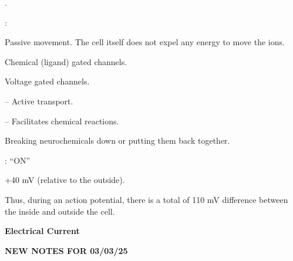 \begin{coloredlist}
\begin{coloredlist}
\begin{coloredlist}
\begin{coloredlist}
\begin{coloredlist}
                    \item {}.
                    \begin{coloredlist}
                        \item {}: 
                        \begin{coloredlist}
                            \item Passive movement. The cell itself does not expel any energy to move the ions.
                            \item Chemical (ligand) gated channels.
                            \item Voltage gated channels.
                        \end{coloredlist}
                    \end{coloredlist}
                    \item {} -- Active transport.
                    \item {} -- Facilitates chemical reactions.
                    \begin{coloredlist}
                        \item Breaking neurochemicals down or putting them back together.
                    \end{coloredlist}
                \end{coloredlist}
            \end{coloredlist}
        \end{coloredlist}
    \end{coloredlist}
    \item {}: ``ON''
    \begin{coloredlist}
        \item +40 mV (relative to the outside).
        \item Thus, during an action potential, there is a total of 110 mV difference between the inside and outside the cell.
        \item \textbf{Electrical Current}
        \begin{coloredlist}
            \item 
        \end{coloredlist}
    \end{coloredlist}
\end{coloredlist}

\begin{center}
    \textbf{NEW NOTES FOR 03/03/25} \\
    \hrulefill
\end{center}

